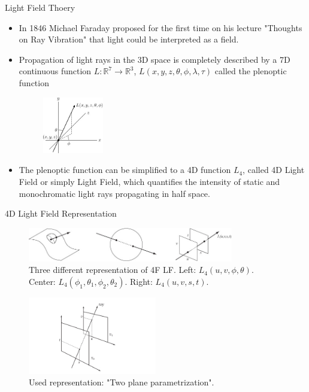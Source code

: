 \begin{frame}{Light Field Thoery}
\begin{block}{}
\begin{itemize}

\item In 1846 Michael Faraday proposed for the first time on his lecture "Thoughts on Ray Vibration" that light could be interpreted as a field.

\pause

\item Propagation of light rays in the 3D space is completely described by a 7D continuous function $L:\mathbb{R}^7\longrightarrow \mathbb{R}^3$, $L(x,y,z,\theta,\phi, \lambda, \tau)$ called the plenoptic function

\pause
\begin{figure}[h!]
\centering
\includegraphics[width=0.25\textwidth]{../../Diagrams/Plenoptic_function.jpg}
\end{figure}

\pause

\item The plenoptic function can be simplified to a 4D function $L_4$, called 4D Light Field or simply Light Field, which quantifies the intensity of static and monochromatic light rays propagating in half space. 
\end{itemize}
\end{block}
\end{frame}

\begin{frame}{4D Light Field Representation}
\begin{figure}[h!]
\includegraphics[width=0.8\textwidth]{../../Diagrams/Light-field-parametrizations.jpg}
\caption{Three different representation of 4F LF\@. Left: $L_4(u,v,\phi,\theta)$. Center: $L_4(\phi_1,\theta_1,\phi_2,\theta_2)$. Right: $L_4(u,v,s,t)$.}
\end{figure}
\pause
\begin{figure}[h!]
\centering
\includegraphics[width=0.5\textwidth]{../../Diagrams/two-planes_param.jpg}
\caption{Used representation: "Two plane parametrization".}
\label{fig:C2S0F3}
\end{figure}
\end{frame}

